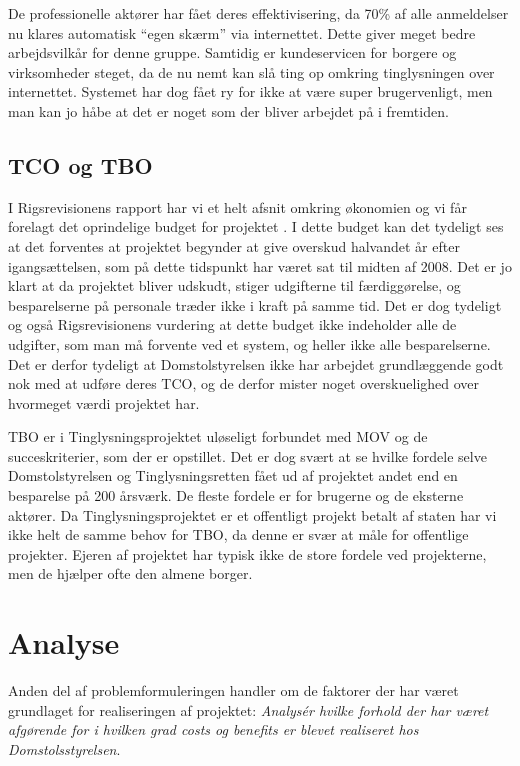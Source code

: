 \documentclass[10pt,a4paper,danish]{article}
\begin{document}
De professionelle aktører har fået deres effektivisering, da 70\% af alle anmeldelser nu klares automatisk "`egen skærm"' via internettet. Dette giver meget bedre arbejdsvilkår for denne gruppe. Samtidig er kundeservicen for borgere og virksomheder steget, da de nu nemt kan slå ting op omkring tinglysningen over internettet. Systemet har dog fået ry for ikke at være super brugervenligt, men man kan jo håbe at det er noget som der bliver arbejdet på i fremtiden.

\subsection{TCO og TBO}
I Rigsrevisionens rapport har vi et helt afsnit omkring økonomien og vi får forelagt det oprindelige budget for projektet \cite[~s. 36]{Rigs}. I dette budget kan det tydeligt ses at det forventes at projektet begynder at give overskud halvandet år efter igangsættelsen, som på dette tidspunkt har været sat til midten af 2008. Det er jo klart at da projektet bliver udskudt, stiger udgifterne til færdiggørelse, og besparelserne på personale træder ikke i kraft på samme tid. Det er dog tydeligt og også Rigsrevisionens vurdering at dette budget ikke indeholder alle de udgifter, som man må forvente ved et system, og heller ikke alle besparelserne. Det er derfor tydeligt at Domstolstyrelsen ikke har arbejdet grundlæggende godt nok med at udføre deres TCO, og de derfor mister noget overskuelighed over hvormeget værdi projektet har.

TBO er i Tinglysningsprojektet uløseligt forbundet med MOV og de succeskriterier, som der er opstillet. Det er dog svært at se hvilke fordele selve Domstolstyrelsen og Tinglysningsretten fået ud af projektet andet end en besparelse på 200 årsværk. De fleste fordele er for brugerne og de eksterne aktører. Da Tinglysningsprojektet er et offentligt projekt betalt af staten har vi ikke helt de samme behov for TBO, da denne er svær at måle for offentlige projekter. Ejeren af projektet har typisk ikke de store fordele ved projekterne, men de hjælper ofte den almene borger.

\section{Analyse}

Anden del af problemformuleringen handler om de faktorer der har været grundlaget for realiseringen af projektet: \textit{Analysér hvilke forhold der har været afgørende for i hvilken grad costs og benefits er blevet realiseret hos Domstolsstyrelsen}.
\end{document}
